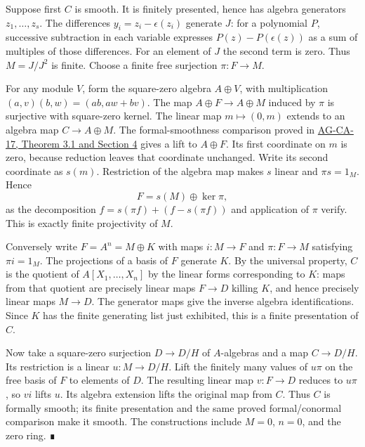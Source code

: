 \documentclass[11pt,a4paper,openany]{report}
\begin{document}
Suppose first \(C\) is smooth. It is finitely presented, hence has algebra generators \(z_1,\ldots,z_s\). The differences \(y_i=z_i-\epsilon(z_i)\) generate \(J\): for a polynomial \(P\), successive subtraction in each variable expresses \(P(z)-P(\epsilon(z))\) as a sum of multiples of those differences. For an element of \(J\) the second term is zero. Thus \(M=J/J^2\) is finite. Choose a finite free surjection \(\pi:F\to M\).

For any module \(V\), form the square-zero algebra \(A\oplus V\), with multiplication \((a,v)(b,w)=(ab,aw+bv)\). The map \(A\oplus F\to A\oplus M\) induced by \(\pi\) is surjective with square-zero kernel. The linear map \(m\mapsto(0,m)\) extends to an algebra map \(C\to A\oplus M\). The formal-smoothness comparison proved in \href{https://github.com/KokunoYumeto/open-math-courses/blob/d02d0a3669f42579db037cd44de1d113fdd770a1/docs/courses/AG-CA/src/formally-smooth-unramified-and-etale-ring-maps.md}{AG-CA-17, Theorem 3.1 and Section 4} gives a lift to \(A\oplus F\). Its first coordinate on \(m\) is zero, because reduction leaves that coordinate unchanged. Write its second coordinate as \(s(m)\). Restriction of the algebra map makes \(s\) linear and \(\pi s=1_M\). Hence \[F=s(M)\oplus\ker\pi,\] as the decomposition \(f=s(\pi f)+(f-s(\pi f))\) and application of \(\pi\) verify. This is exactly finite projectivity of \(M\).

Conversely write \(F=A^n=M\oplus K\) with maps \(i:M\to F\) and \(\pi:F\to M\) satisfying \(\pi i=1_M\). The projections of a basis of \(F\) generate \(K\). By the universal property, \(C\) is the quotient of \(A[X_1,\ldots,X_n]\) by the linear forms corresponding to \(K\): maps from that quotient are precisely linear maps \(F\to D\) killing \(K\), and hence precisely linear maps \(M\to D\). The generator maps give the inverse algebra identifications. Since \(K\) has the finite generating list just exhibited, this is a finite presentation of \(C\).

Now take a square-zero surjection \(D\to D/H\) of \(A\)-algebras and a map \(C\to D/H\). Its restriction is a linear \(u:M\to D/H\). Lift the finitely many values of \(u\pi\) on the free basis of \(F\) to elements of \(D\). The resulting linear map \(v:F\to D\) reduces to \(u\pi\), so \(vi\) lifts \(u\). Its algebra extension lifts the original map from \(C\). Thus \(C\) is formally smooth; its finite presentation and the same proved formal/conormal comparison make it smooth. The constructions include \(M=0\), \(n=0\), and the zero ring. ∎
\end{document}
